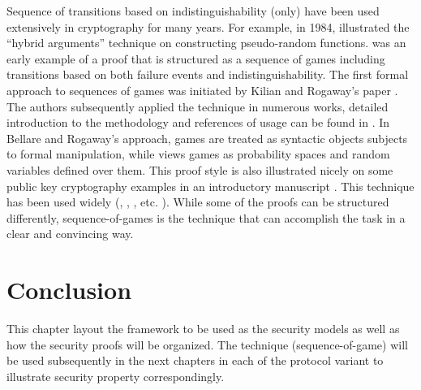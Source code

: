 Sequence of transitions based on indistinguishability (only) have been used
extensively in cryptography for many years. For example, in 1984,
\cite{goldreich1984construct} illustrated the ``hybrid arguments'' technique on
constructing pseudo-random functions. \cite{bellare1989new} was an early example
of a proof that is structured as a sequence of games including transitions based
on both failure events and indistinguishability. The first formal approach to
sequences of games was initiated by Kilian and Rogaway's paper
\cite{kilian1996protect}. The authors subsequently applied the technique in
numerous works, detailed introduction to the methodology and references of usage
can be found in \cite{bellare2004game}. In Bellare and Rogaway's approach, games
are treated as syntactic objects subjects to formal manipulation, while
\cite{shoup2004sequences} views games as probability spaces and random variables
defined over them. This proof style is also illustrated nicely on some public
key cryptography examples in an introductory manuscript
\cite{pointcheval2005provable}. This technique has been used widely
(\cite{abdalla2005password}, \cite{boneh2005improved}, \cite{bresson2002group},
etc. ). While some of the proofs can be structured differently,
sequence-of-games is the technique that can accomplish the task in a clear and
convincing way.

\section{Conclusion}
This chapter layout the framework to be used as the security models as well as
how the security proofs will be organized. The technique (sequence-of-game) will
be used subsequently in the next chapters in each of the protocol variant to
illustrate security property correspondingly. 
